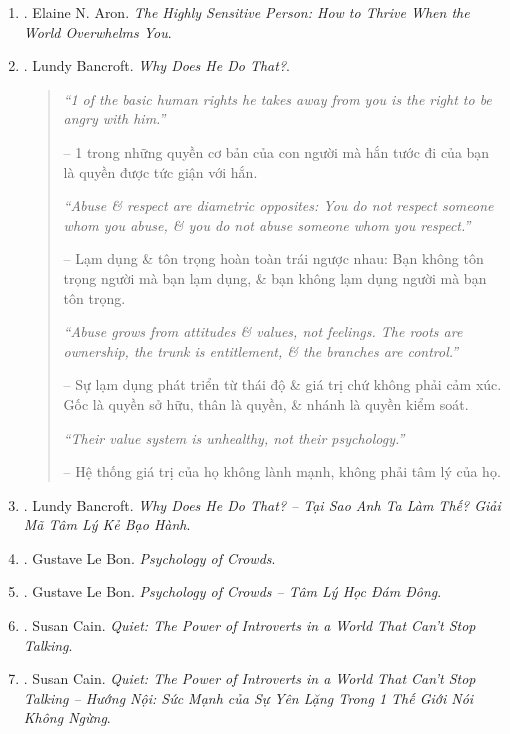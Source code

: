 \documentclass{article}
\begin{document}
\begin{enumerate}
	\item \cite{Aron_HSP}. Elaine N. Aron. {\it The Highly Sensitive Person: How to Thrive When the World Overwhelms You}.\hfill{\sf[done]}
	
	\item \cite{Bancroft_why_he_do}. Lundy Bancroft. {\it Why Does He Do That?}.\hfill{\sf[reading]}
	\begin{quotation}
		{\it``1 of the basic human rights he takes away from you is the right to be angry with him.''}
		
		-- 1 trong những quyền cơ bản của con người mà hắn tước đi của bạn là quyền được tức giận với hắn.
		
		{\it``Abuse \& respect are diametric opposites: You do not respect someone whom you abuse, \& you do not abuse someone whom you respect.''}
		
		-- Lạm dụng \& tôn trọng hoàn toàn trái ngược nhau: Bạn không tôn trọng người mà bạn lạm dụng, \& bạn không lạm dụng người mà bạn tôn trọng.
		
		{\it``Abuse grows from attitudes \& values, not feelings. The roots are ownership, the trunk is entitlement, \& the branches are control.''}
		
		-- Sự lạm dụng phát triển từ thái độ \& giá trị chứ không phải cảm xúc. Gốc là quyền sở hữu, thân là quyền, \& nhánh là quyền kiểm soát.
		
		{\it``Their value system is unhealthy, not their psychology.''}
		
		-- Hệ thống giá trị của họ không lành mạnh, không phải tâm lý của họ.
	\end{quotation}
	
	\item \cite{Bancroft_why_he_do_VN}. Lundy Bancroft. {\it Why Does He Do That? -- Tại Sao Anh Ta Làm Thế? Giải Mã Tâm Lý Kẻ Bạo Hành}.\hfill{\sf[done]}
	
	\item \cite{Bon_crowd_psychology}. {\sc Gustave Le Bon}. {\it Psychology of Crowds}.
	
	\item \cite{Bon_crowd_psychology_VN}. {\sc Gustave Le Bon}. {\it Psychology of Crowds -- Tâm Lý Học Đám Đông}.\hfill{\sf[done]}
	
	\item \cite{Cain_quiet}. Susan Cain. {\it Quiet: The Power of Introverts in a World That Can't Stop Talking}.\hfill{\sf[reading]}
	
	\item \cite{Cain_quiet_VN}. Susan Cain. {\it Quiet: The Power of Introverts in a World That Can't Stop Talking -- Hướng Nội: Sức Mạnh của Sự Yên Lặng Trong 1 Thế Giới Nói Không Ngừng}.\hfill{\sf[done]}
	

\end{enumerate}
\end{document}
